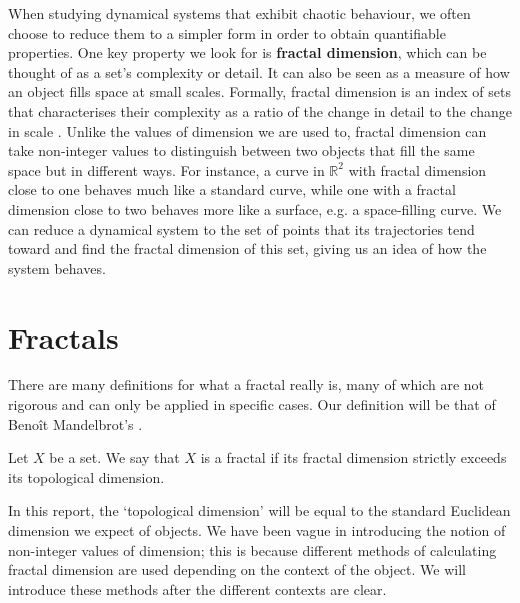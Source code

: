 
When studying dynamical systems that exhibit chaotic behaviour, we often choose to reduce them to a simpler form in order to obtain quantifiable properties. One key property we look for is \textbf{fractal dimension}, which can be thought of as a set's complexity or detail. It can also be seen as a measure of how an object fills space at small scales. Formally, fractal dimension is an index of sets that characterises their complexity as a ratio of the change in detail to the change in scale \cite{mandelbrot1983fractal}. Unlike the values of dimension we are used to, fractal dimension can take non-integer values to distinguish between two objects that fill the same space but in different ways. For instance, a curve in $\mathbb{R}^2$ with fractal dimension close to one behaves much like a standard curve, while one with a fractal dimension close to two behaves more like a surface, e.g. a space-filling curve. We can reduce a dynamical system to the set of points that its trajectories tend toward and find the fractal dimension of this set, giving us an idea of how the system behaves.

\section{Fractals}
There are many definitions for what a fractal really is, many of which are not rigorous and can only be applied in specific cases. Our definition will be that of Benoît Mandelbrot's \cite{mandelbrot1983fractal}.
\begin{defn}
    Let $X$ be a set. We say that $X$ is a fractal if its fractal dimension strictly exceeds its topological dimension.
\end{defn}
In this report, the `topological dimension' will be equal to the standard Euclidean dimension we expect of objects. We have been vague in introducing the notion of non-integer values of dimension; this is because different methods of calculating fractal dimension are used depending on the context of the object. We will introduce these methods after the different contexts are clear.

